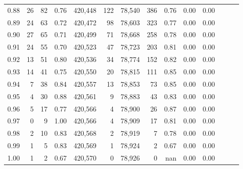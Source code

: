 \begin{tabular}{rrrrrrrrrrrrrr}
0.88 &      26 &     82 &  0.76 &  420,448 &      122 &  78,540 &     386 &  0.76 &  0.00 &      0.00 \\
0.89 &      24 &     63 &  0.72 &  420,472 &       98 &  78,603 &     323 &  0.77 &  0.00 &      0.00 \\
0.90 &      27 &     65 &  0.71 &  420,499 &       71 &  78,668 &     258 &  0.78 &  0.00 &      0.00 \\
0.91 &      24 &     55 &  0.70 &  420,523 &       47 &  78,723 &     203 &  0.81 &  0.00 &      0.00 \\
0.92 &      13 &     51 &  0.80 &  420,536 &       34 &  78,774 &     152 &  0.82 &  0.00 &      0.00 \\
0.93 &      14 &     41 &  0.75 &  420,550 &       20 &  78,815 &     111 &  0.85 &  0.00 &      0.00 \\
0.94 &       7 &     38 &  0.84 &  420,557 &       13 &  78,853 &      73 &  0.85 &  0.00 &      0.00 \\
0.95 &       4 &     30 &  0.88 &  420,561 &        9 &  78,883 &      43 &  0.83 &  0.00 &      0.00 \\
0.96 &       5 &     17 &  0.77 &  420,566 &        4 &  78,900 &      26 &  0.87 &  0.00 &      0.00 \\
0.97 &       0 &      9 &  1.00 &  420,566 &        4 &  78,909 &      17 &  0.81 &  0.00 &      0.00 \\
0.98 &       2 &     10 &  0.83 &  420,568 &        2 &  78,919 &       7 &  0.78 &  0.00 &      0.00 \\
0.99 &       1 &      5 &  0.83 &  420,569 &        1 &  78,924 &       2 &  0.67 &  0.00 &      0.00 \\
1.00 &       1 &      2 &  0.67 &  420,570 &        0 &  78,926 &       0 &   nan &  0.00 &      0.00 \\
\bottomrule
\end{tabular}
